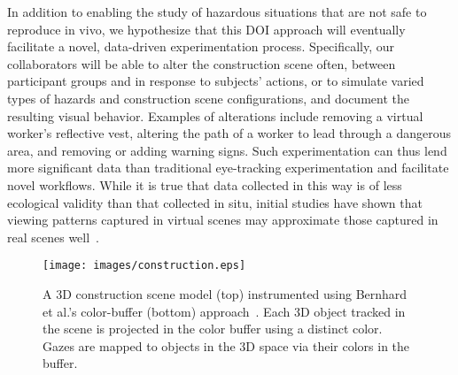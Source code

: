 In addition to enabling the study of hazardous situations that are not safe to reproduce in vivo, we hypothesize that this DOI approach will eventually facilitate a novel, data-driven experimentation process. Specifically, our collaborators will be able to alter the construction scene often, between participant groups and in response to subjects' actions, or to simulate varied types of hazards and construction scene configurations, and document the resulting visual behavior. Examples of alterations include removing a virtual worker's reflective vest, altering the path of a worker to lead through a dangerous area, and removing or adding warning signs. Such experimentation can thus lend more significant data than traditional eye-tracking experimentation and facilitate novel workflows. While it is true that data collected in this way is of less ecological validity than that collected in situ, initial studies have shown that viewing patterns captured in virtual scenes may approximate those captured in real scenes well~\cite{nipesh}.

\begin{figure}[htbp]
  \centering
  \texttt{[image: images/construction.eps]}
  \caption{A 3D construction scene model (top) instrumented using Bernhard et al.'s color-buffer (bottom) approach~\cite{Bern14}. Each 3D object tracked in the scene is projected in the color buffer using a distinct color. Gazes are mapped to objects in the 3D space via their colors in the buffer.}
	\label{fig:construction}
\end{figure}